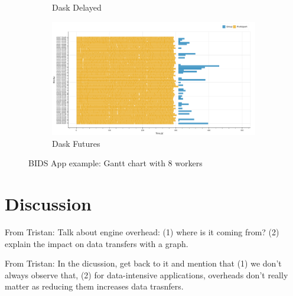 \documentclass[conference]{IEEEtran}
\newcommand{\TG}[1]{\color{cyan}From Tristan: #1 \color{black}}
\begin{document}
\begin{figure}[!htb]
\begin{subfigure}[b]{\columnwidth}
        \caption{Dask Delayed}\label{fig:bids_dask_delayed_gantt}
    \end{subfigure}
    \hfill
    \begin{subfigure}[b]{\columnwidth}
        \includegraphics[clip,width=\columnwidth]{images/futures_bids_gantt.png}%
        \caption{Dask Futures}\label{fig:bids_dask_futures_gantt}
    \end{subfigure}
    \caption{BIDS App example: Gantt chart with 8 workers}\label{fig:bids_gantt}
\end{figure}



\section{Discussion}

\TG{Talk about engine overhead: (1) where is it coming from? (2) 
explain the impact on data transfers with a graph.}

\TG{In the dicussion, get back to it and mention that (1) we don't
always observe that, (2) for data-intensive applications, overheads don't really matter
as reducing them increases data trasnfers.}

\end{document}
